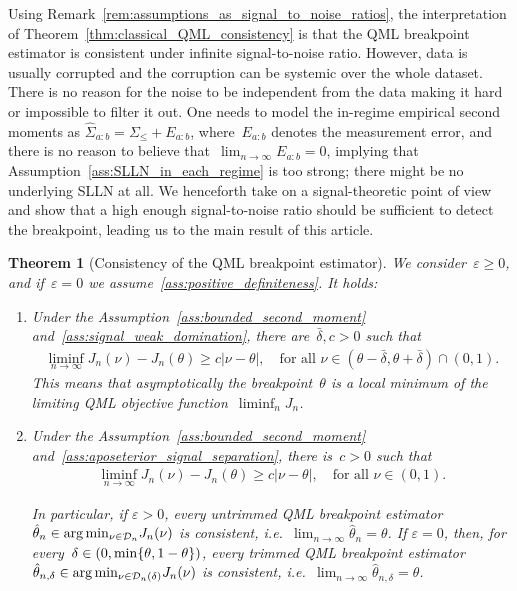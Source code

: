 \documentclass[10pt, letterpaper]{amsart}
\newtheorem{theorem}{Theorem}
\def\min{{\rm min}}
\begin{document}
Using Remark~\ref{rem:assumptions_as_signal_to_noise_ratios}, the interpretation of Theorem~\ref{thm:classical_QML_consistency} is that the QML breakpoint estimator is consistent under infinite signal-to-noise ratio. However, data is usually corrupted and the corruption can be systemic over the whole dataset. There is no reason for the noise to be independent from the data making it hard or impossible to filter it out. One needs to model the in-regime empirical second moments as
$\widehat \Sigma_{a:b} = \Sigma_{\leq} + E_{a:b}$, where~$E_{a:b}$ denotes the measurement error, and there is no reason to believe that~$\lim_{n \to \infty} E_{a:b} = 0$, implying that Assumption~\ref{ass:SLLN_in_each_regime} is too strong; there might be no underlying SLLN at all. We henceforth take on a signal-theoretic point of view and show that a high enough signal-to-noise ratio should be sufficient to detect the breakpoint, leading us to the main result of this article.

\begin{theorem}[Consistency of the QML breakpoint estimator]
\label{thm:QML-robust}
We consider~$\varepsilon \geq 0$, and if~$\varepsilon =0$ we assume~\ref{ass:positive_definiteness}. It holds:
\begin{enumerate}[label=(\roman*)]
    \item Under the Assumption~\ref{ass:bounded_second_moment} and~\ref{ass:signal_weak_domination}, there are~$\bar\delta, c>0$ such that
    \begin{align}
        \liminf_{n \to \infty} J_n(\nu) - J_n(\theta) \geq c |\nu - \theta|, \quad \mbox{for all~$\nu \in (\theta -\bar\delta, \theta+ \bar\delta)\cap(0,1)$.}
    \end{align}
    This means that asymptotically the breakpoint~$\theta$ is a local minimum of the limiting QML objective function~$
    \liminf_{n} J_n$.\medskip
    
    \item Under the Assumption~\ref{ass:bounded_second_moment} and~\ref{ass:aposeterior_signal_separation}, there is~$c>0$ such that
        \begin{align}\label{equ:minimizer_a4}
        \liminf_{n \to \infty} J_n(\nu) - J_n(\theta) \geq c |\nu - \theta|, \quad \mbox{for all~$\nu \in (0,1)$.}
    \end{align}
    
      In particular, if $\varepsilon>0$, every untrimmed QML breakpoint estimator $\hat \theta_{n}\in \arg \min_{\nu \in \mathcal D_n} J_n(\nu)$ is consistent, i.e.~$\lim_{n \to \infty} \hat \theta_n = \theta$. \newline
      If $\varepsilon=0$, then, for every~$\delta \in (0,\min\{\theta,1-\theta\})$, every trimmed QML breakpoint estimator $\hat \theta_{n,\delta}\in \arg \min_{\nu \in \mathcal D_n(\delta) } J_n(\nu)$ is consistent, i.e.~$\lim_{n \to \infty} \hat \theta_{n,\delta} = \theta$.
    
\end{enumerate}
\end{theorem}
\end{document}
